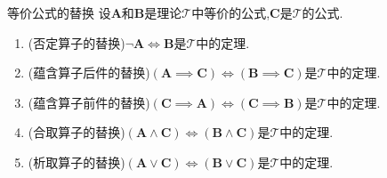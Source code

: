 \begin{metatheorem}{等价公式的替换}{}
	设$\boldsymbol{A}$和$\boldsymbol{B}$是理论$\mathcal{T}$中等价的公式,$\boldsymbol{C}$是$\mathcal{T}$的公式.
	\begin{enumerate}
		\item (否定算子的替换)$\neg\boldsymbol{A}\iff\boldsymbol{B}$是$\mathcal{T}$中的定理.
		\item (蕴含算子后件的替换)$\left(\boldsymbol{A}\implies\boldsymbol{C}\right)\iff\left(\boldsymbol{B}\implies\boldsymbol{C}\right)$是$\mathcal{T}$中的定理.
		\item (蕴含算子前件的替换)$\left(\boldsymbol{C}\implies\boldsymbol{A}\right)\iff\left(\boldsymbol{C}\implies\boldsymbol{B}\right)$是$\mathcal{T}$中的定理.
		\item (合取算子的替换)$\left(\boldsymbol{A}\wedge\boldsymbol{C}\right)\iff\left(\boldsymbol{B}\wedge\boldsymbol{C}\right)$是$\mathcal{T}$中的定理.
		\item (析取算子的替换)$\left(\boldsymbol{A}\vee\boldsymbol{C}\right)\iff\left(\boldsymbol{B}\vee\boldsymbol{C}\right)$是$\mathcal{T}$中的定理.
	\end{enumerate}
\end{metatheorem}

